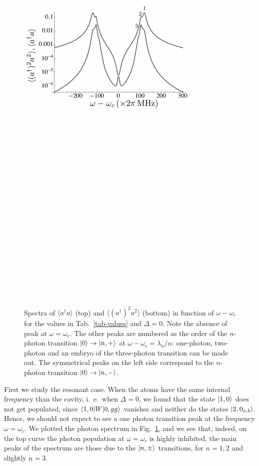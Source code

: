 \begin{figure}
    \center
    \includegraphics[width=0.75 \textwidth]{Images/chap5/spectrum0.pdf}
    \caption[$\langle a^\dagger a \rangle$ and $\langle (a^\dagger)^2 a^2 \rangle$  in function of  $\omega-\omega_c$]{Spectra of $\langle a^\dagger a \rangle$ (top) and $\langle (a^\dagger)^2 a^2 \rangle$ (bottom) in function of  $\omega-\omega_c$ for the values in Tab.~\ref{tab-values} and $\Delta=0$. Note the absence of peak at $\omega=\omega_c$. The other peaks are numbered as the order of the $n$-photon transition $| 0 \rangle \rightarrow | n,+ \rangle$ at $\omega-\omega_c=\lambda_n/n$: one-photon, two-photon and an embryo of the three-photon transition can be made out. The symmetrical peaks on the left side correspond to the $n$-photon transition $| 0 \rangle \rightarrow | n,- \rangle$.}
    \label{fig-spec0}
\end{figure}

First we study the resonant case. When the atoms have the same internal frequency than the cavity, i.~e.~when $\Delta=0$, we found that the state $| 1,0 \rangle$ does not get populated, since $\langle 1,0 | W | 0,gg \rangle$ vanishes and neither do the states $| 2,0_{a,b} \rangle$. Hence, we should not expect to see a one photon transition peak at the frequency $\omega=\omega_c$. We plotted the photon spectrum in Fig.~\ref{fig-spec0}, and we see that, indeed, on the top curve the photon population at $\omega=\omega_c$ is highly inhibited, the main peaks of the spectrum are those due to the $| n,\pm \rangle$ transitions, for $n=1, 2$ and slightly $n=3$.

